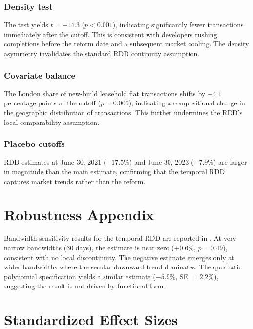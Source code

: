 \documentclass[12pt]{article}
\begin{document}
\subsubsection*{Density test} The \citet{cattaneo2020density} test yields $t = -14.3$ ($p < 0.001$), indicating significantly fewer transactions immediately after the cutoff. This is consistent with developers rushing completions before the reform date and a subsequent market cooling. The density asymmetry invalidates the standard RDD continuity assumption.

\subsubsection*{Covariate balance} The London share of new-build leasehold flat transactions shifts by $-4.1$ percentage points at the cutoff ($p = 0.006$), indicating a compositional change in the geographic distribution of transactions. This further undermines the RDD's local comparability assumption.

\subsubsection*{Placebo cutoffs} RDD estimates at June 30, 2021 ($-17.5\%$) and June 30, 2023 ($-7.9\%$) are larger in magnitude than the main estimate, confirming that the temporal RDD captures market trends rather than the reform.

\section{Robustness Appendix}

Bandwidth sensitivity results for the temporal RDD are reported in . At very narrow bandwidths (30 days), the estimate is near zero ($+0.6\%$, $p = 0.49$), consistent with no local discontinuity. The negative estimate emerges only at wider bandwidths where the secular downward trend dominates. The quadratic polynomial specification yields a similar estimate ($-5.9\%$, SE $= 2.2\%$), suggesting the result is not driven by functional form.

\section{Standardized Effect Sizes}
\label{sec:sde}


\end{document}

